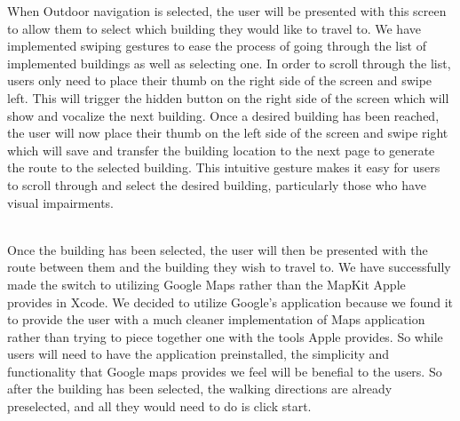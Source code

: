\documentclass[letterpaper,12pt]{article}
\begin{document}
    When Outdoor navigation is selected, the user will be presented with this screen to allow them to select which building they would like to travel to. We have implemented swiping gestures to ease the process of going through the list of implemented buildings as well as selecting one. In order to scroll through the list, users only need to place their thumb on the right side of the screen and swipe left. This will trigger the hidden button on the right side of the screen which will show and vocalize the next building. Once a desired building has been reached, the user will now place their thumb on the left side of the screen and swipe right which will save and transfer the building location to the next page to generate the route to the selected building. This intuitive gesture makes it easy for users to scroll through and select the desired building, particularly those who have visual impairments. 
    
    
 \\

    Once the building has been selected, the user will then be presented with the route between them and the building they wish to travel to. We have successfully made the switch to utilizing Google Maps rather than the MapKit Apple provides in Xcode. We decided to utilize Google's application because we found it to provide the user with a much cleaner implementation of Maps application rather than trying to piece together one with the tools Apple provides. So while users will need to have the application preinstalled, the simplicity and functionality that Google maps provides we feel will be benefial to the users. So after the building has been selected, the walking directions are already preselected, and all they would need to do is click start. 
    
    
 \\
\end{document}
